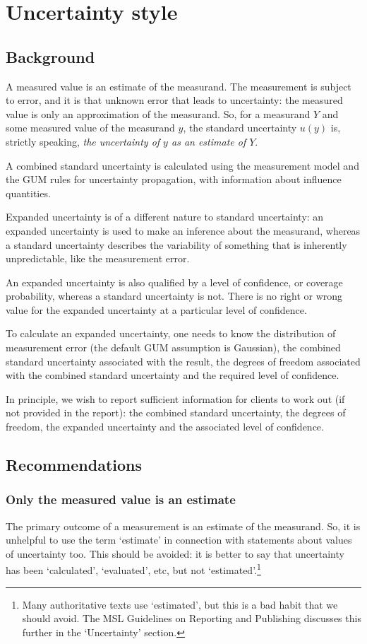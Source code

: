 \section{Uncertainty style}
\subsection{Background}
A measured value is an estimate of the measurand. The measurement is subject to error, and it is that unknown error that leads to uncertainty: the measured value is only an approximation of the measurand. So, for a measurand $Y$ and some measured value of the measurand $y$, the standard uncertainty $u(y)$ is, strictly speaking, \textit{the uncertainty of $y$ as an estimate of $Y$}.

A combined standard uncertainty is calculated using the measurement model and the GUM rules for uncertainty propagation, with information about influence quantities. 

Expanded uncertainty is of a different nature to standard uncertainty: an expanded uncertainty is used to make an inference about the measurand, whereas a standard uncertainty describes the variability of something that is inherently unpredictable, like the measurement error.
 
An expanded uncertainty is also qualified by a level of confidence, or coverage probability, whereas a standard uncertainty is not. There is no right or wrong value for the expanded uncertainty at a particular level of confidence.

To calculate an expanded uncertainty, one needs to know the distribution of measurement error (the default GUM assumption is Gaussian), the combined standard uncertainty associated with the result, the degrees of freedom associated with the combined standard uncertainty and the required level of confidence. 

In principle, we wish to report sufficient information for clients to work out (if not provided in the report): the combined standard uncertainty, the degrees of freedom, the expanded uncertainty and the associated level of confidence. 

\subsection{Recommendations}
\subsubsection{Only the measured value is an estimate}
The primary outcome of a measurement is an estimate of the measurand. So, it is unhelpful to use the term `estimate' in connection with statements about values of uncertainty too. This should be avoided: it is better to say that uncertainty has been `calculated', `evaluated', etc, but not `estimated'.\footnote{Many authoritative texts use `estimated', but this is a bad habit that we should avoid. The MSL Guidelines on Reporting and Publishing discusses this further in the `Uncertainty' section.} 

